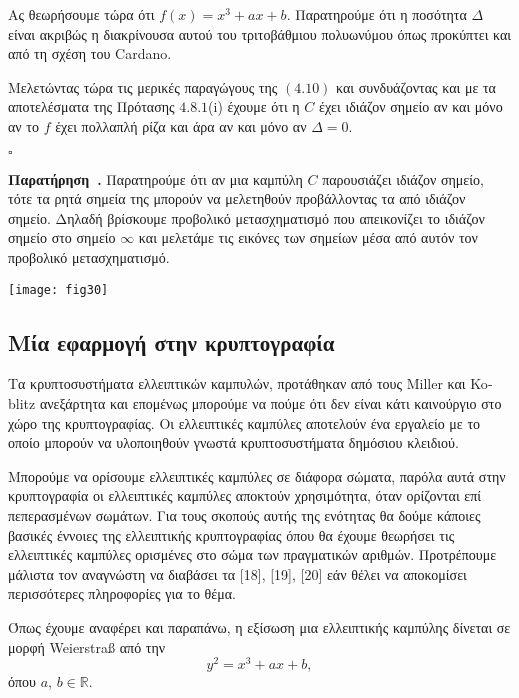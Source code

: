 \documentclass[12pt, a4paper]{book}
\newcounter{remark}[section]
\newenvironment{remark}[1][]{\refstepcounter{remark}\par\medskip
   \textbf{Παρατήρηση~\theremark. #1} \rmfamily}{\medskip}
\begin{document}
Ας θεωρήσουμε τώρα ότι $f(x)=x^3+ax+b$. Παρατηρούμε ότι η ποσότητα $Δ$ είναι ακριβώς η διακρίνουσα αυτού του τριτοβάθμιου πολυωνύμου όπως προκύπτει και από τη σχέση του \textlatin{Cardano}.


Μελετώντας τώρα τις μερικές παραγώγους της $(4.10)$ και συνδυάζοντας και με τα αποτελέσματα της Πρότασης $4.8.1$\textlatin{(i)}  έχουμε ότι η $C$ έχει ιδιάζον σημείο αν και μόνο αν το  $f$ έχει πολλαπλή ρίζα και άρα αν και μόνο αν $Δ=0$.

	\begin{flushright}
	$\square$
	\end{flushright}
\newpage

\begin{remark}
Παρατηρούμε ότι αν μια καμπύλη $C$ παρουσιάζει ιδιάζον σημείο, τότε τα ρητά σημεία της μπορούν να μελετηθούν προβάλλοντας τα από ιδιάζον σημείο. Δηλαδή βρίσκουμε προβολικό μετασχηματισμό που απεικονίζει το ιδιάζον σημείο στο σημείο $\infty$ και μελετάμε τις εικόνες των σημείων μέσα από αυτόν τον προβολικό μετασχηματισμό.
\end{remark}

\begin{center}
\texttt{[image: fig30]}
\end{center}

\subsection{Μία εφαρμογή στην κρυπτογραφία}

Τα κρυπτοσυστήματα ελλειπτικών καμπυλών, προτάθηκαν από τους \textlatin{Miller} και \textlatin{Koblitz} ανεξάρτητα και επομένως μπορούμε να πούμε ότι δεν είναι κάτι καινούργιο στο χώρο της κρυπτογραφίας. Οι ελλειπτικές καμπύλες αποτελούν ένα εργαλείο με το οποίο μπορούν να υλοποιηθούν γνωστά κρυπτοσυστήματα δημόσιου κλειδιού.

Μπορούμε να ορίσουμε ελλειπτικές καμπύλες σε διάφορα σώματα, παρόλα αυτά στην κρυπτογραφία οι ελλειπτικές καμπύλες αποκτούν χρησιμότητα, όταν ορίζονται επί πεπερασμένων σωμάτων. Για τους σκοπούς αυτής της ενότητας θα δούμε κάποιες βασικές έννοιες της ελλειπτικής κρυπτογραφίας όπου θα έχουμε θεωρήσει τις ελλειπτικές καμπύλες ορισμένες στο σώμα των πραγματικών αριθμών. Προτρέπουμε μάλιστα τον αναγνώστη να διαβάσει τα [18], [19], [20] εάν θέλει να αποκομίσει περισσότερες πληροφορίες για το θέμα.

Όπως έχουμε αναφέρει και παραπάνω, η εξίσωση μια ελλειπτικής καμπύλης δίνεται σε μορφή \textlatin{Weierstraß} από την
\begin{displaymath}
y^2=x^3+ax+b,
\end{displaymath}
όπου $a$, $b \in \mathbb{R}$.
\end{document}
